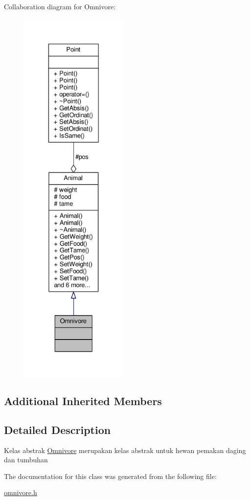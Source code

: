 Collaboration diagram for Omnivore\+:
\nopagebreak
\begin{figure}[H]
\begin{center}
\leavevmode
\includegraphics[height=550pt]{classOmnivore__coll__graph}
\end{center}
\end{figure}
\subsection*{Additional Inherited Members}


\subsection{Detailed Description}
Kelas abstrak \hyperlink{classOmnivore}{Omnivore} merupakan kelas abstrak untuk hewan pemakan daging dan tumbuhan 

The documentation for this class was generated from the following file\+:\begin{DoxyCompactItemize}
\item 
\hyperlink{omnivore_8h}{omnivore.\+h}\end{DoxyCompactItemize}
